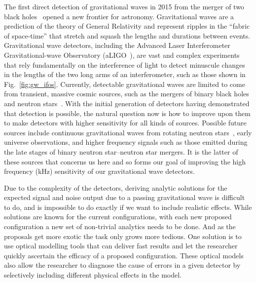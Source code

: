 \documentclass[aps,pra,superscriptaddress,reprint,nofootinbib]{revtex4-1}
\begin{document}
The first direct detection of gravitational waves in 2015 from the merger of two black holes~\cite{GW150914} opened a new frontier for astronomy. 
Gravitational waves are a prediction of the theory of General Relativity and represent ripples in the ``fabric of space-time'' that stretch and squash the lengths and durations between events. Gravitational wave detectors, including the Advanced Laser Interferometer Gravitational-wave Observatory (aLIGO~\cite{AdvancedLIGO:2015}), are vast and complex experiments that rely fundamentally on the interference of light to detect minuscule changes in the lengths of the two long arms of an interferometer, such as those shown in Fig.~\ref{fig:gw_ifos}. Currently, detectable gravitational waves are limited to come from transient, massive cosmic sources, such as the mergers of binary black holes and neutron stars~\cite{GWTC-1:2018}. With the initial generation of detectors having demonstrated that detection is possible, the natural question now is how to improve upon them to make detectors with higher sensitivity for all kinds of sources.
Possible future sources include continuous gravitational waves from rotating neutron stars~\cite{SuvorovaEtAl:2016}, early universe observations, and higher frequency signals such as those emitted during the late stages of binary neutron star--neutron star mergers.
It is the latter of these sources that concerns us here and so forms our goal of improving the high frequency (kHz) sensitivity of our gravitational wave detectors.


Due to the complexity of the detectors, deriving analytic solutions for the expected signal and noise output due to a passing gravitational wave is difficult to do, and is impossible to do exactly if we want to include realistic effects. %
While solutions are known for the current configurations, with each new proposed configuration a new set of non-trivial analytics needs to be done. And as the proposals get more exotic the task only grows more tedious.
One solution is to use optical modelling tools that can deliver fast results and let the researcher quickly ascertain the efficacy of a proposed configuration. These optical models also allow the researcher to diagnose the cause of errors in a given detector by selectively including different physical effects in the model.
\end{document}
